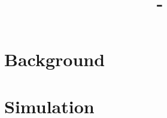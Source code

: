 \documentclass[answers,12pt,addpoints]{exam}
\author{\name}
\title{\course \ - \assignment}
\begin{document}
\maketitle
\tableofcontents
\newpage
\section{Background}




\newpage
\section{Simulation}
\end{document}

